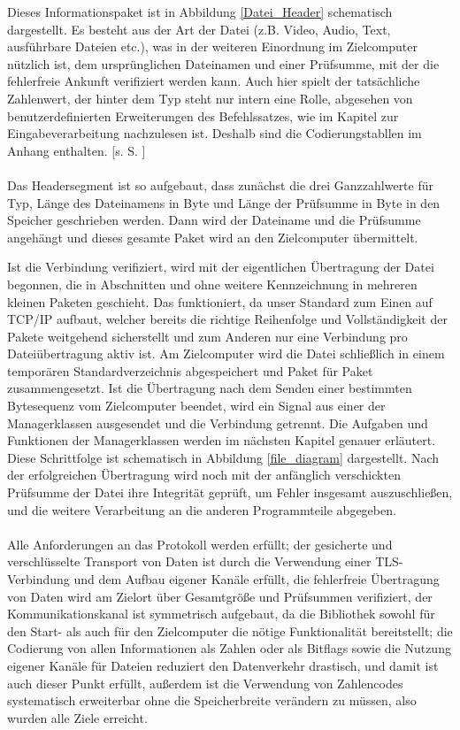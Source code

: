 Dieses Informationspaket ist in Abbildung \ref{Datei_Header} schematisch dargestellt.
Es besteht aus der Art der Datei (z.B. Video, Audio, Text, ausführbare Dateien etc.), was in der weiteren Einordnung im Zielcomputer nützlich ist, dem ursprünglichen Datei\-namen und einer Prüfsumme, mit der die fehlerfreie Ankunft verifiziert werden kann. Auch hier spielt der tatsächliche Zahlenwert, der hinter dem Typ steht nur intern eine Rolle, abgesehen von benutzerdefinierten Erweiterungen des Befehlssatzes, wie im Kapitel zur Eingabeverarbeitung nachzulesen ist. Deshalb sind die Codierungstabllen im Anhang enthalten. [s. S. \pageref{enums}]\\\\
Das Headersegment ist so aufgebaut, dass zunächst die drei Ganzzahlwerte für Typ, Länge des Dateinamens in Byte und Länge der Prüfsumme in Byte in den Speicher geschrieben werden. 
Dann wird der Dateiname und die Prüfsumme angehängt und dieses gesamte Paket wird an den Zielcomputer übermittelt.\par
Ist die Verbindung verifiziert, wird mit der eigentlichen Übertragung der Datei begonnen, die in Abschnitten und ohne weitere Kennzeichnung in mehreren kleinen Paketen geschieht.
Das funktioniert, da unser Standard zum Einen auf TCP/IP aufbaut, welcher bereits die richtige Reihenfolge und Vollständigkeit der Pakete weitgehend sicherstellt und zum Anderen nur eine Verbindung pro Dateiübertragung aktiv ist.
Am Zielcomputer wird die Datei schließlich in einem temporären Standardverzeichnis abgespeichert und Paket für Paket zusammengesetzt.
Ist die Übertragung nach dem Senden einer bestimmten Bytesequenz vom Zielcomputer beendet, wird ein Signal aus einer der Managerklassen ausgesendet und die Verbindung getrennt. Die Aufgaben und Funktionen der Managerklassen werden im nächsten Kapitel genauer erläutert.
Diese Schrittfolge ist schematisch in Abbildung \ref{file_diagram} dargestellt.
Nach der erfolgreichen Übertragung wird noch mit der anfänglich verschickten Prüfsumme der Datei ihre Integrität geprüft, um Fehler insgesamt auszuschließen, und die weitere Verarbeitung an die anderen Programmteile abgegeben.\\\\
Alle Anforderungen an das Protokoll werden erfüllt; der gesicherte und verschlüsselte Transport von Daten ist durch die Verwendung einer TLS-Verbindung und dem Aufbau eigener Kanäle erfüllt, die fehlerfreie Übertragung von Daten wird am Zielort über Gesamtgröße und Prüfsummen verifiziert, der Kommunikationskanal ist symmetrisch aufgebaut, da die Bibliothek sowohl für den Start- als auch für den Zielcomputer die nötige Funktionalität bereitstellt; die Codierung von allen Informationen als Zahlen oder als Bitflags sowie die Nutzung eigener Kanäle für Dateien reduziert den Datenverkehr drastisch, und damit ist auch dieser Punkt erfüllt, außerdem ist die Verwendung von Zahlencodes systematisch erweiterbar ohne die Speicherbreite verändern zu müssen, also wurden alle Ziele erreicht.


